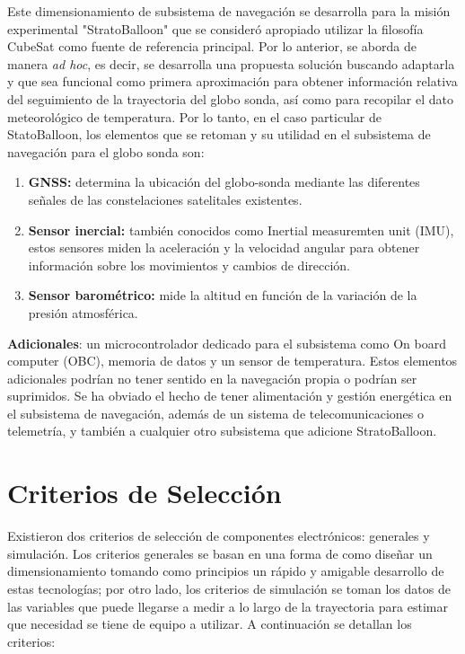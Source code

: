 Este dimensionamiento de subsistema de navegación se desarrolla para la misión experimental "StratoBalloon" que se consideró apropiado utilizar la filosofía CubeSat como fuente de referencia principal. Por lo anterior,  se aborda de manera \textit{ad hoc}, es decir, se desarrolla una propuesta solución buscando adaptarla y que sea funcional como primera aproximación  para obtener  información relativa del seguimiento de la trayectoria del globo sonda, así como para recopilar el dato meteorológico de temperatura. Por lo tanto, en el caso particular de StatoBalloon,  los elementos que se retoman y su utilidad en el subsistema de navegación para el globo sonda son:

\begin{enumerate}
    \item \textbf{GNSS:} determina la ubicación del globo-sonda mediante las diferentes señales de las constelaciones satelitales existentes.
    \item \textbf{Sensor inercial:} también conocidos como Inertial measuremten unit (IMU), estos sensores miden la aceleración y la velocidad angular para obtener información sobre los movimientos y cambios de dirección.
    \item \textbf{Sensor barométrico:} mide la altitud en función de la variación de la presión atmosférica. 
\end{enumerate}

\textbf{Adicionales}: un microcontrolador dedicado para el subsistema como On board computer (OBC), memoria de datos y  un sensor de temperatura. Estos elementos adicionales podrían no tener sentido en la navegación propia o podrían ser  suprimidos. Se ha obviado el hecho de tener alimentación y gestión energética en el subsistema de navegación, además de un sistema de telecomunicaciones o telemetría, y también a cualquier otro subsistema que adicione StratoBalloon.

\newpage

\section{Criterios de Selección}

Existieron dos criterios de selección de componentes electrónicos: generales y simulación. Los criterios generales se basan en una forma de como diseñar un dimensionamiento tomando como principios un rápido y amigable desarrollo de estas tecnologías; por otro lado, los criterios de simulación se toman los datos de las variables que puede llegarse a medir a lo largo de la trayectoria para estimar que necesidad se tiene de equipo a utilizar.  A continuación se detallan los criterios:

